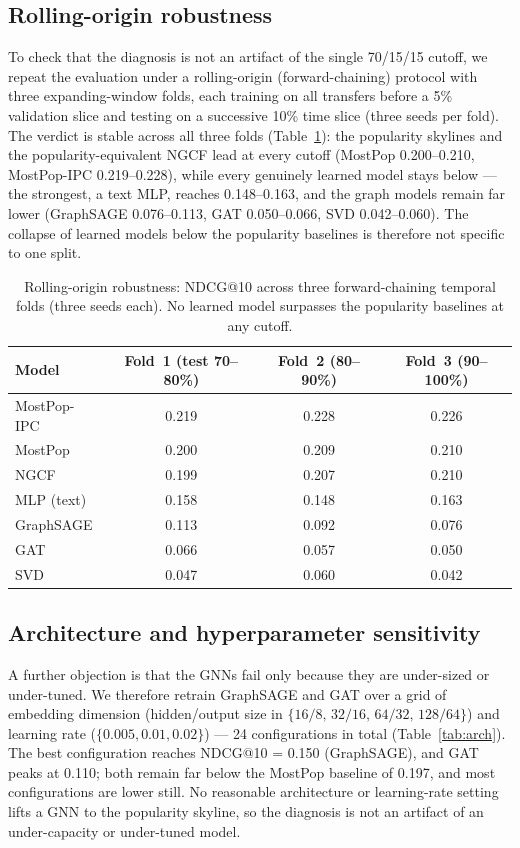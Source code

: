 \documentclass[preprint,12pt]{elsarticle}
\begin{document}
\subsection{Rolling-origin robustness}
\label{sec:rolling}
To check that the diagnosis is not an artifact of the single 70/15/15 cutoff, we repeat
the evaluation under a rolling-origin (forward-chaining) protocol with three
expanding-window folds, each training on all transfers before a 5\% validation slice
and testing on a successive 10\% time slice (three seeds per fold). The verdict is
stable across all three folds (Table~\ref{tab:rolling}): the popularity skylines and
the popularity-equivalent NGCF lead at every cutoff (MostPop 0.200--0.210, MostPop-IPC
0.219--0.228), while every genuinely learned model stays below --- the strongest, a
text MLP, reaches 0.148--0.163, and the graph models remain far lower (GraphSAGE
0.076--0.113, GAT 0.050--0.066, SVD 0.042--0.060). The collapse of learned models below
the popularity baselines is therefore not specific to one split.

\begin{table}[t]
\centering
\caption{Rolling-origin robustness: NDCG@10 across three forward-chaining temporal
folds (three seeds each). No learned model surpasses the popularity baselines at any
cutoff.}
\label{tab:rolling}
\begin{tabular}{lccc}
\toprule
Model & Fold~1 (test 70--80\%) & Fold~2 (80--90\%) & Fold~3 (90--100\%) \\
\midrule
MostPop-IPC & 0.219 & 0.228 & 0.226 \\
MostPop     & 0.200 & 0.209 & 0.210 \\
NGCF        & 0.199 & 0.207 & 0.210 \\
MLP (text)  & 0.158 & 0.148 & 0.163 \\
GraphSAGE   & 0.113 & 0.092 & 0.076 \\
GAT         & 0.066 & 0.057 & 0.050 \\
SVD         & 0.047 & 0.060 & 0.042 \\
\bottomrule
\end{tabular}
\end{table}

\subsection{Architecture and hyperparameter sensitivity}
\label{sec:arch}
A further objection is that the GNNs fail only because they are under-sized or
under-tuned. We therefore retrain GraphSAGE and GAT over a grid of embedding dimension
(hidden/output size in $\{16/8,\,32/16,\,64/32,\,128/64\}$) and learning rate
($\{0.005, 0.01, 0.02\}$) --- 24 configurations in total
(Table~\ref{tab:arch}). The best configuration reaches NDCG@10 = 0.150 (GraphSAGE), and
GAT peaks at 0.110; both remain far below the MostPop baseline of 0.197, and most
configurations are lower still. No reasonable architecture or learning-rate setting
lifts a GNN to the popularity skyline, so the diagnosis is not an artifact of an
under-capacity or under-tuned model.
\end{document}

